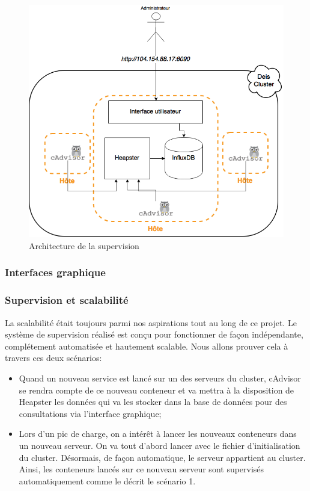 \begin{onehalfspace}
\begin{figure}[H]
\centering
\includegraphics [scale=0.6]{chapitre4/assets/monitoring-cluster}
\caption{Architecture de la supervision}
\label{fig:}
\end{figure}


\subsubsection{Interfaces graphique}



\subsubsection{Supervision et scalabilité}

La scalabilité était toujours parmi nos aspirations tout au long de ce projet. Le système de supervision réalisé est conçu pour fonctionner de façon indépendante, complétement automatisée et hautement scalable. Nous allons prouver cela à travers ces deux scénarios:

\begin{itemize}
	\item Quand un nouveau service est lancé sur un des serveurs du cluster, cAdvisor se rendra compte de ce nouveau conteneur et va mettra à la disposition de Heapster les données qui va les stocker dans la base de données pour des consultations via l'interface graphique;
	\item Lors d'un pic de charge, on a intérêt à lancer les nouveaux conteneurs dans un nouveau serveur. On va tout d'abord lancer avec le fichier d'initialisation du cluster. Désormais, de façon automatique, le serveur appartient au cluster. Ainsi, les conteneurs lancés sur ce nouveau serveur sont supervisés automatiquement comme le décrit le scénario 1.
\end{itemize}


\end{onehalfspace}
